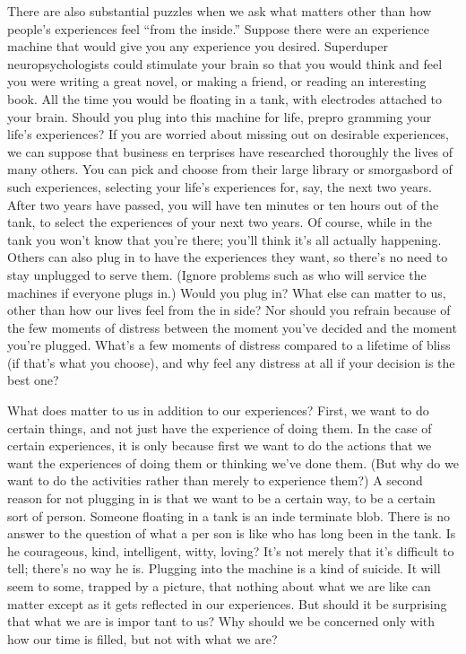 \documentclass[11pt,openany]{book}
\begin{document}
There are also substantial puzzles when we ask what matters other than how people's experiences feel ``from the inside.'' Suppose there were an experience machine that would give you any experience you desired. Superduper neuropsychologists could stimulate your brain so that you would think and feel you were writing a great novel, or making a friend, or reading an interesting book. All the time you would be floating in a tank, with electrodes attached to your brain. Should you plug into this machine for life, prepro gramming your life's experiences? If you are worried about missing out on desirable experiences, we can suppose that business en terprises have researched thoroughly the lives of many others. You can pick and choose from their large library or smorgasbord of such experiences, selecting your life's experiences for, say, the next two years. After two years have passed, you will have ten minutes or ten hours out of the tank, to select the experiences of your next two years. Of course, while in the tank you won't know that you're there; you'll think it's all actually happening. Others can also plug in to have the experiences they want, so there's no need to stay unplugged to serve them. (Ignore problems such as who will service the machines if everyone plugs in.) Would you plug in? What else can matter to us, other than how our lives feel from the in side? Nor should you refrain because of the few moments of distress between the moment you've decided and the moment you're plugged. What's a few moments of distress compared to a lifetime of bliss (if that's what you choose), and why feel any distress at all if your decision is the best one? 

What does matter to us in addition to our experiences? First, we want to do certain things, and not just have the experience of doing them. In the case of certain experiences, it is only because first we want to do the actions that we want the experiences of doing them or thinking we've done them. (But why do we want to do the activities rather than merely to experience them?) A second reason for not plugging in is that we want to be a certain way, to be a certain sort of person. Someone floating in a tank is an inde terminate blob. There is no answer to the question of what a per son is like who has long been in the tank. Is he courageous, kind, intelligent, witty, loving? It's not merely that it's difficult to tell; there's no way he is. Plugging into the machine is a kind of suicide. It will seem to some, trapped by a picture, that nothing about what we are like can matter except as it gets reflected in our experiences. But should it be surprising that what we are is impor tant to us? Why should we be concerned only with how our time is filled, but not with what we are? 
\end{document}
